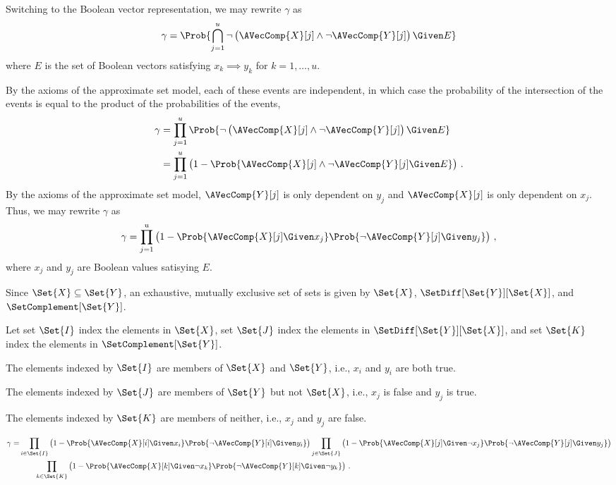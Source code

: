 \documentclass[ ../main.tex]{subfiles}
\newcommand{\tsr}{\gamma}
\begin{document}
Switching to the Boolean vector representation, we may rewrite $\gamma$ as
\begin{equation}
\tsr = \Prob{\bigcap_{j=1}^{u} \neg \left(\AVecComp{X}[j] \land \neg 
	\AVecComp{Y}[j]\right) \Given E}
\end{equation}
where $E$ is the set of Boolean vectors satisfying $x_k \implies y_k$ for $k=1,\ldots,u$.

By the axioms of the approximate set model, each of these events are independent, in which case the probability of the intersection of the events is equal to the product of the probabilities of the events,
\begin{align}
\tsr
&= \prod_{j=1}^{u} \Prob{\neg\left(\AVecComp{X}[j] 
	\land \neg \AVecComp{Y}[j]\right) \Given E}\\
&= \prod_{j=1}^{u} \left(1 - \Prob{\AVecComp{X}[j] 
	\land \neg \AVecComp{Y}[j] \Given E}\right)\,.
\end{align}
By the axioms of the approximate set model, $\AVecComp{Y}[j]$ is only dependent on $y_j$ and $\AVecComp{X}[j]$ is only dependent on $x_j$.
Thus, we may rewrite 
$\tsr$ as
\begin{equation}
\tsr = \prod_{j=1}^{u}\left(
1 - \Prob{\AVecComp{X}[j] \Given x_j}
\Prob{\neg \AVecComp{Y}[j] \Given y_j}\right)\,,
\end{equation}
where $x_j$ and $y_j$ are Boolean values satisying $E$.

Since $\Set{X} \subseteq \Set{Y}$, an exhaustive, mutually exclusive set of sets is given by $\Set{X}$, $\SetDiff[\Set{Y}][\Set{X}]$, and $\SetComplement[\Set{Y}]$.

Let set $\Set{I}$ index the elements in $\Set{X}$, set $\Set{J}$ index the elements in $\SetDiff[\Set{Y}][\Set{X}]$, and set $\Set{K}$ index the elements in $\SetComplement[\Set{Y}]$.

The elements indexed by $\Set{I}$ are members of $\Set{X}$ and $\Set{Y}$, i.e., $x_i$ and $y_i$ are both true.

The elements indexed by $\Set{J}$ are members of $\Set{Y}$ but not $\Set{X}$, i.e., $x_j$ is false and $y_j$ is true.

The elements indexed by $\Set{K}$ are members of neither, i.e., $x_j$ and $y_j$ are false.

\begin{equation}
\begin{split}
\tsr =
&\prod_{i \in \Set{I}}
\left(1-\Prob{\AVecComp{X}[i] \Given x_i}
\Prob{\neg \AVecComp{Y}[i] \Given y_i}\right)
\prod_{j \in \Set{J}}
\left(1-\Prob{\AVecComp{X}[j] \Given \neg x_j}
\Prob{\neg \AVecComp{Y}[j] \Given y_j}\right)\\
&\qquad \prod_{k \in \Set{K}}
\left(1-\Prob{\AVecComp{X}[k] \Given \neg x_k}
\Prob{\neg \AVecComp{Y}[k] \Given \neg y_k}\right)\,.  
\end{split}    
\end{equation}
\end{document}
